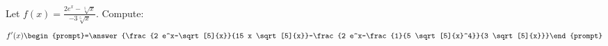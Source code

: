 \documentclass{ximera}
\author{Bart Snapp}
\begin{document}
\begin{exercise}
Let $f(x) = \frac{ 2 e^x-\sqrt[5]{x}}{-3 \sqrt[5]{x}}$. Compute:
\[
f'(x)
\begin{prompt}=\answer{\frac{2 e^x-\sqrt[5]{x}}{15 x \sqrt[5]{x}}-\frac{2 e^x-\frac{1}{5 \sqrt[5]{x}^4}}{3 \sqrt[5]{x}}}\end{prompt}
\]
\end{exercise}
\end{document}
